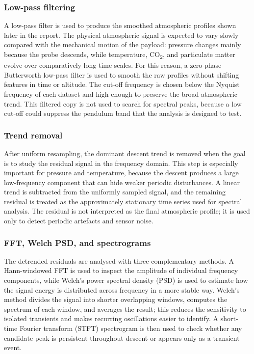 \subsubsection{Low-pass filtering}
A low-pass filter is used to produce the smoothed atmospheric profiles shown later in the report. The physical atmospheric signal is expected to vary slowly compared with the mechanical motion of the payload: pressure changes mainly because the probe descends, while temperature, CO\textsubscript{2}, and particulate matter evolve over comparatively long time scales. For this reason, a zero-phase Butterworth low-pass filter is used to smooth the raw profiles without shifting features in time or altitude. The cut-off frequency is chosen below the Nyquist frequency of each dataset and high enough to preserve the broad atmospheric trend. This filtered copy is not used to search for spectral peaks, because a low cut-off could suppress the pendulum band that the analysis is designed to test.

\subsubsection{Trend removal}
After uniform resampling, the dominant descent trend is removed when the goal is to study the residual signal in the frequency domain. This step is especially important for pressure and temperature, because the descent produces a large low-frequency component that can hide weaker periodic disturbances. A linear trend is subtracted from the uniformly sampled signal, and the remaining residual is treated as the approximately stationary time series used for spectral analysis. The residual is not interpreted as the final atmospheric profile; it is used only to detect periodic artefacts and sensor noise.

\subsubsection{FFT, Welch PSD, and spectrograms}
The detrended residuals are analysed with three complementary methods. A Hann-windowed FFT is used to inspect the amplitude of individual frequency components, while Welch's power spectral density (PSD) is used to estimate how the signal energy is distributed across frequency in a more stable way. Welch's method divides the signal into shorter overlapping windows, computes the spectrum of each window, and averages the result; this reduces the sensitivity to isolated transients and makes recurring oscillations easier to identify. A short-time Fourier transform (STFT) spectrogram is then used to check whether any candidate peak is persistent throughout descent or appears only as a transient event.


